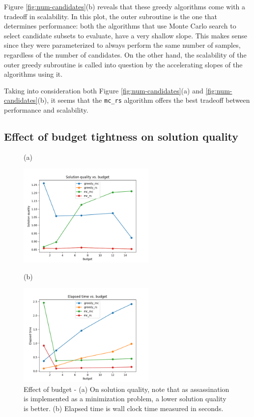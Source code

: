 Figure \ref{fig:num-candidates}(b) reveals that these greedy algorithms come with a tradeoff in scalability.
In this plot, the outer subroutine is the one that determines performance: both the algorithms that use Monte Carlo search to select candidate subsets to evaluate, have a very shallow slope.
This makes sense since they were parameterized to always perform the same number of samples, regardless of the number of candidates.
On the other hand, the scalability of the outer greedy subroutine is called into question by the accelerating slopes of the algorithms using it.

Taking into consideration both Figure \ref{fig:num-candidates}(a) and \ref{fig:num-candidates}(b), it seems that the \texttt{mc\_rs} algorithm offers the best tradeoff between performance and scalability.

\subsection{Effect of budget tightness on solution quality}

\begin{figure}[h!]
    \centering
    
    (a)
     
     \includegraphics[width=0.6\textwidth]{figs/budget_results_multi_ground_set_plot.png}

    (b)
    
     \includegraphics[width=0.6\textwidth]{figs/budget_results_multi_ground_set_time_plot.png}
    \caption{Effect of budget - (a) On solution quality, note that as assassination is implemented as a minimization problem, a lower solution quality is better. (b) Elapsed time is wall clock time measured in seconds.}
    \label{fig:budget}
\end{figure}

